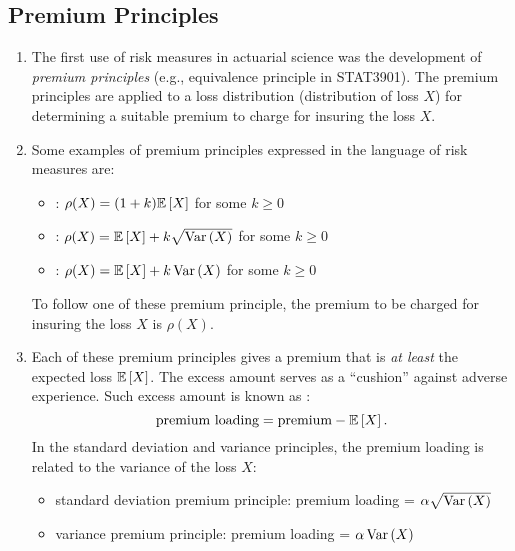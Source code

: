 \subsection{Premium Principles}
\begin{enumerate}
\item The first use of risk measures in actuarial science was the development
of \emph{premium principles} (e.g., equivalence principle in STAT3901). The
premium principles are applied to a loss distribution (distribution of loss
\(X\)) for determining a suitable premium to charge for insuring the loss
\(X\).

\item Some examples of premium principles expressed in the language of risk
measures are:
\begin{itemize}
\item {}: \(\rho(X)=(1+k)\mathbb{E}\left[X\right]\)
for some \(k\ge 0\)
\item {}: \(\rho(X)=\mathbb{E}\left[X\right]+k\sqrt{\operatorname{Var}\left(X\right)}\)
for some \(k\ge 0\)
\item {}: \(\rho(X)=\mathbb{E}\left[X\right]+k\operatorname{Var}\left(X\right)\)
for some \(k\ge 0\)
\end{itemize}
\begin{note}
To follow one of these premium principle, the premium to be charged for
insuring the loss \(X\) is \(\rho(X)\).
\end{note}

\item Each of these premium principles gives a premium that is \emph{at least}
the expected loss \(\mathbb{E}\left[X\right]\). The excess amount serves as a ``cushion''
against adverse experience. Such excess amount is known as :
\[
\text{premium loading}=\text{premium}-\mathbb{E}\left[X\right].
\]
In the standard deviation and variance principles, the premium loading is
related to the variance of the loss \(X\):
\begin{itemize}
\item standard deviation premium principle: premium loading = \(\alpha\sqrt{\operatorname{Var}\left(X\right)}\)
\item variance premium principle: premium loading = \(\alpha\operatorname{Var}\left(X\right)\)
\end{itemize}
\end{enumerate}
